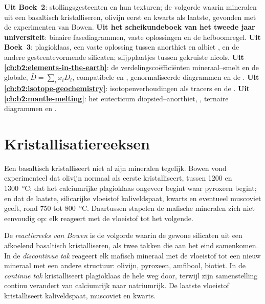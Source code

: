 \begin{recall}
\textbf{Uit Boek~2}: stollingsgesteenten en hun texturen; de volgorde
waarin mineralen uit een basaltisch  kristalliseren, olivijn eerst en kwarts als laatste,
gevonden met de experimenten van Bowen. \textbf{Uit het scheikundeboek van het tweede jaar universiteit}:
binaire fasediagrammen, vaste oplossingen en de hefboomregel. \textbf{Uit
Boek~3}: plagioklaas, een vaste oplossing tussen anorthiet  en albiet
, en de andere gesteentevormende silicaten; slijpplaatjes tussen gekruiste
nicols. \textbf{Uit \cref{ch:b2:elements-in-the-earth}}: de verdelingscoëfficiënten mineraal--smelt
en de globale, $\bar D = \sum_i x_i D_i$, compatibele en , genormaliseerde diagrammen en de . \textbf{Uit
\cref{ch:b2:isotope-geochemistry}}: isotopenverhoudingen als tracers en de
. \textbf{Uit \cref{ch:b2:mantle-melting}}: het eutecticum diopsied--anorthiet,
, ternaire diagrammen en .
\end{recall}

\section{Kristallisatiereeksen}\label{sec:b2:magmatic-differentiation:sequences}

Een basaltisch  kristalliseert niet al zijn mineralen tegelijk. Bowen vond
experimenteel dat olivijn normaal als eerste kristalliseert, tussen 1200 en
\qty{1300}{\celsius}; dat het calciumrijke plagioklaas ongeveer begint waar pyroxeen
begint; en dat de laatste, silicarijke vloeistof kaliveldspaat, kwarts en
eventueel muscoviet geeft, rond 750 tot \qty{800}{\celsius}. Daartussen stapelen de mafische
mineralen zich niet eenvoudig op: elk reageert met de vloeistof tot het volgende.

\begin{definition}\label{def:b2:magmatic-differentiation:bowen}
De \emph{reactiereeks van Bowen} is de volgorde waarin
de gewone silicaten uit een afkoelend basaltisch  kristalliseren, als twee takken
die aan het eind samenkomen. In de \emph{discontinue tak} reageert elk mafisch mineraal
met de vloeistof tot een nieuw mineraal met een andere structuur: olivijn,
pyroxeen, amfibool, biotiet. In de \emph{continue tak} kristalliseert plagioklaas
de hele weg door, terwijl zijn samenstelling continu verandert van calciumrijk
naar natriumrijk. De laatste vloeistof kristalliseert kaliveldspaat, muscoviet en
kwarts.
\end{definition}

